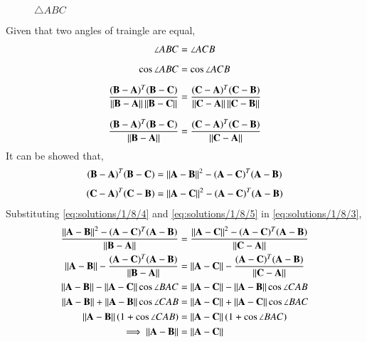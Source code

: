 \begin{figure}[!ht] 
\label{fig:solutions/1/8/triangle_abc}
\centering
\resizebox{\columnwidth}{!}{}
\caption{$\triangle ABC$}
\end{figure}
Given that two angles of traingle are equal,
\begin{align}
    \label{eq:solutions/1/8/1}\angle{ABC}&=\angle{ACB}\\[5pt]
\cos\angle{ABC} &= \cos\angle{ACB}\\[5pt]
    \label{eq:solutions/1/8/2}\frac{(\mathbf{B}-\mathbf{A})^T(\mathbf{B}-\mathbf{C})}{\left\lVert\mathbf{B}-\mathbf{A}\right\rVert\left\lVert\mathbf{B}-\mathbf{C}\right\rVert} &= \frac{(\mathbf{C}-\mathbf{A})^T(\mathbf{C}-\mathbf{B})}{\left\lVert\mathbf{C}-\mathbf{A}\right\rVert\left\lVert\mathbf{C}-\mathbf{B}\right\rVert}\\[7pt]
    \label{eq:solutions/1/8/3}\frac{(\mathbf{B}-\mathbf{A})^T(\mathbf{B}-\mathbf{C})}{\left\lVert\mathbf{B}-\mathbf{A}\right\rVert} &= \frac{(\mathbf{C}-\mathbf{A})^T(\mathbf{C}-\mathbf{B})}{\left\lVert\mathbf{C}-\mathbf{A}\right\rVert}
\end{align}
It can be showed that,
\begin{multline}
    \label{eq:solutions/1/8/4}
(\mathbf{B}-\mathbf{A})^T(\mathbf{B}-\mathbf{C}) = \left\lVert\mathbf{A}-\mathbf{B}\right\rVert^2 - (\mathbf{A}-\mathbf{C})^T(\mathbf{A}-\mathbf{B})
\end{multline}
\begin{multline}
    \label{eq:solutions/1/8/5}(\mathbf{C}-\mathbf{A})^T(\mathbf{C}-\mathbf{B}) = \left\lVert\mathbf{A}-\mathbf{C}\right\rVert^2 - (\mathbf{A}-\mathbf{C})^T(\mathbf{A}-\mathbf{B})
\end{multline}
Substituting \eqref{eq:solutions/1/8/4} and \eqref{eq:solutions/1/8/5} in \eqref{eq:solutions/1/8/3},
{\footnotesize
\begin{align}
\label{eq:solutions/1/8/6}\frac{\left\lVert\mathbf{A}-\mathbf{B}\right\rVert^2 - (\mathbf{A}-\mathbf{C})^T(\mathbf{A}-\mathbf{B})}{\left\lVert\mathbf{B}-\mathbf{A}\right\rVert}&=\frac{\left\lVert\mathbf{A}-\mathbf{C}\right\rVert^2 - (\mathbf{A}-\mathbf{C})^T(\mathbf{A}-\mathbf{B})}{\left\lVert\mathbf{C}-\mathbf{A}\right\rVert}\\
\label{eq:solutions/1/8/7}\left\lVert\mathbf{A}-\mathbf{B}\right\rVert - \frac{(\mathbf{A}-\mathbf{C})^T(\mathbf{A}-\mathbf{B})}{\left\lVert\mathbf{B}-\mathbf{A}\right\rVert}&=\left\lVert\mathbf{A}-\mathbf{C}\right\rVert - \frac{(\mathbf{A}-\mathbf{C})^T(\mathbf{A}-\mathbf{B})}{\left\lVert\mathbf{C}-\mathbf{A}\right\rVert}\\
\label{eq:solutions/1/8/8}\left\lVert\mathbf{A}-\mathbf{B}\right\rVert - \left\lVert\mathbf{A}-\mathbf{C}\right\rVert \cos{\angle{BAC}}&=\left\lVert\mathbf{A}-\mathbf{C}\right\rVert - \left\lVert\mathbf{A}-\mathbf{B}\right\rVert \cos{\angle{CAB}}\\
\label{eq:solutions/1/8/9}\left\lVert\mathbf{A}-\mathbf{B}\right\rVert +  \left\lVert\mathbf{A}-\mathbf{B}\right\rVert \cos{\angle{CAB}}&=\left\lVert\mathbf{A}-\mathbf{C}\right\rVert + \left\lVert\mathbf{A}-\mathbf{C}\right\rVert \cos{\angle{BAC}}\\
\label{eq:solutions/1/8/10}\left\lVert\mathbf{A}-\mathbf{B}\right\rVert(1 + \cos{\angle{CAB}})&=\left\lVert\mathbf{A}-\mathbf{C}\right\rVert(1 + \cos{\angle{BAC}})\\
\implies\left\lVert\mathbf{A}-\mathbf{B}\right\rVert &= \left\lVert\mathbf{A}-\mathbf{C}\right\rVert
\end{align}
}
